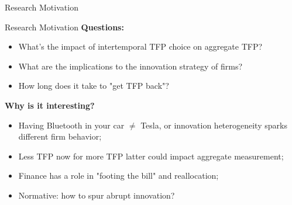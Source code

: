 \documentclass[11pt]{beamer}
\begin{document}
\begin{frame}{Research Motivation}
	\begin{center}
	\begin{figure}\centering\label{Ratio_emp}
	\end{figure}
	\end{center}
\end{frame}

\begin{frame}{Research Motivation}
	\textbf{Questions:}
	\begin{itemize}\itemsep12pt
		\item What's the impact of intertemporal TFP choice on aggregate TFP?
		\item What are the implications to the innovation strategy of firms? 
		\item How long does it take to "get TFP back"?
	\end{itemize}	 
	\textbf{Why is it interesting?}
    \begin{itemize}\itemsep12pt
	\item Having Bluetooth in your car $\neq$ Tesla, or innovation heterogeneity sparks different firm behavior;
	\item Less TFP now for more TFP latter could impact aggregate measurement;
	\item Finance has a role in "footing the bill" and reallocation;
	\item Normative: how to spur abrupt innovation?
	\end{itemize}
\end{frame}
\end{document}
